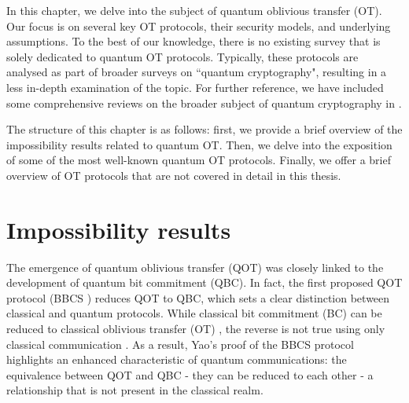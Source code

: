 In this chapter, we delve into the subject of quantum oblivious transfer (OT). Our focus is on several key OT protocols, their security models, and underlying assumptions. To the best of our knowledge, there is no existing survey that is solely dedicated to quantum OT protocols. Typically, these protocols are analysed as part of broader surveys on ``quantum cryptography", resulting in a less in-depth examination of the topic. For further reference, we have included some comprehensive reviews on the broader subject of quantum cryptography in \cite{BC96, B05, M06, F10, B15, PAB+20, PR21, SH22}.

The structure of this chapter is as follows: first, we provide a brief overview of the impossibility results related to quantum OT. Then, we delve into the exposition of some of the most well-known quantum OT protocols. Finally, we offer a brief overview of OT protocols that are not covered in detail in this thesis.

\section{Impossibility results}

The emergence of quantum oblivious transfer (QOT) was closely linked to the development of quantum bit commitment (QBC). In fact, the first proposed QOT protocol (BBCS \cite{BBCS92}) reduces QOT to QBC, which sets a clear distinction between classical and quantum protocols. While classical bit commitment (BC) can be reduced to classical oblivious transfer (OT) \cite{K88}, the reverse is not true using only classical communication \cite{S99}. As a result, Yao's proof \cite{Y95} of the BBCS protocol \cite{BBCS92} highlights an enhanced characteristic of quantum communications: the equivalence between QOT and QBC - they can be reduced to each other - a relationship that is not present in the classical realm.



